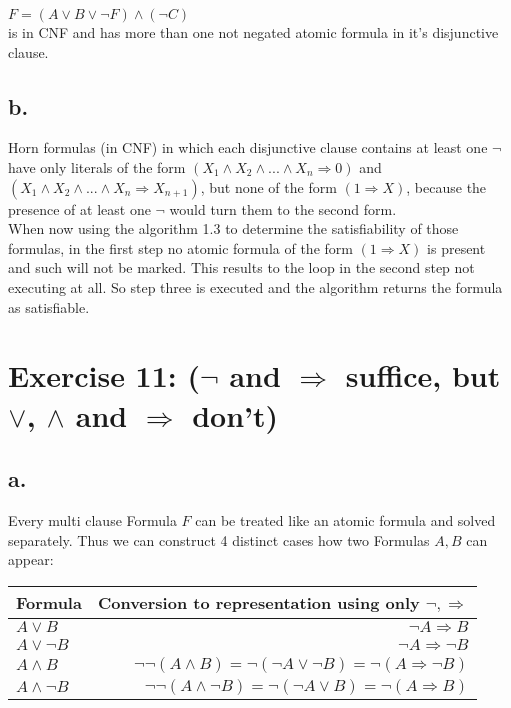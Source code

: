 \documentclass[12pt]{article}
\begin{document}
$F = (A \lor B \lor \lnot F) \land (\lnot C)$\\
is in CNF and has more than one not negated atomic formula in it's disjunctive clause.\\

\subsection*{b.}

Horn formulas (in CNF) in which each disjunctive clause contains at least one $\neg$ have only literals of the form $(X_1 \land X_2 \land ... \land X_n \Rightarrow 0)$ and $(X_1 \land X_2 \land ...  \land X_n \Rightarrow X_{n+1})$, but none of the form $(1 \Rightarrow X)$, because the presence of at least one $\neg$ would turn them to the second form.\\
When now using the algorithm 1.3 to determine the satisfiability of those formulas, in the first step no atomic formula of the form $(1 \Rightarrow X)$ is present and such will not be marked. This results to the loop in the second step not executing at all. So step three is executed and the algorithm returns the formula as satisfiable.

\section*{Exercise 11:  ($\neg$ and $\Rightarrow$ suffice, but $\lor$, $\land$ and $\Rightarrow$ don’t)}

\subsection*{a.}
Every multi clause Formula $F$ can be treated like an atomic formula and solved separately. Thus we can construct 4 distinct cases how two Formulas $A, B$ can appear:\\

\begin{tabular}{  l | r }
	Formula & Conversion to representation using only $\lnot, \Rightarrow$ \\ \hline
	$A \lor B$ & $\lnot A \Rightarrow B$\\ \hline
	$A \lor \lnot B$ & $\lnot A \Rightarrow \lnot B$\\ \hline 
	$A \land B$ & $\lnot \lnot (A \land B) = \lnot (\lnot A \lor \lnot B) = \lnot (A \Rightarrow \lnot B)$\\ \hline 
	$A \land \lnot B$ & $\lnot \lnot (A \land \lnot B) = \lnot (\lnot A \lor B) = \lnot (A \Rightarrow B)$\\ 
\end{tabular}
\end{document}
